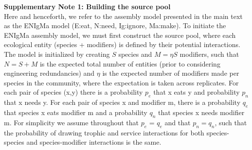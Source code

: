 \documentclass[onecolumn,preprintnumbers,amsmath,amssymb,superscriptaddress]{revtex4-1}
\newcommand{\rr}[1]{{\rm #1}}
\begin{document}
\begin{bibunit}
\noindent \textbf{Supplementary Note 1: Building the source pool}\\
Here and henceforth, we refer to the assembly model presented in the main text as the ENIgMa model (E:eat, N:need, Ig:ignore, Ma:make).
To initiate the ENIgMa assembly model, we must first construct the source pool, where each ecological entity (species + modifiers) is defined by their potential interactions.
The model is initialized by creating $S$ species and $M = \eta S$ modifiers, such that $N=S+M$ is the expected total number of entities (prior to considering engineering redundancies) and $\eta$ is the expected number of modifiers made per species in the community, where the expectation is taken across replicates.
For each pair of species (x,y) there is a probability $p_e$ that x eats y and probability $p_n$ that x needs y.
For each pair of species x and modifier m, there is a probability $q_e$ that species x eats modifier m and a probability $q_n$ that species x needs modifier m.
For simplicity we assume throughout that $p_e$ = $q_e$ and that $p_n = q_n$, such that the probability of drawing trophic and service interactions for both species-species and species-modifier interactions is the same.


\end{bibunit}
\end{document}
